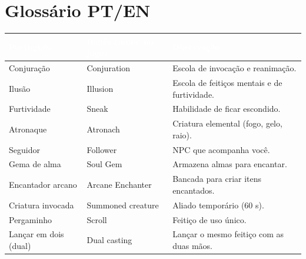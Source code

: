 \documentclass[11pt,a4paper,oneside,openany]{book}
\newcommand{\cabec}[1]{\textcolor{white}{\sffamily\bfseries\small #1}}
\newcommand{\tabhead}{\rowcolor{NecroEmerald}}
\begin{document}
\chapter{Glossário PT/EN}
\begin{center}
\small
{}
\begin{tabularx}{\linewidth}{@{}L{4cm}L{4cm}Y@{}}
\tabhead \cabec{Português} & \cabec{Inglês (nome no jogo)} & \cabec{Observação} \\
\toprule
Conjuração & Conjuration & Escola de invocação e reanimação. \\
Ilusão & Illusion & Escola de feitiços mentais e de furtividade. \\
Furtividade & Sneak & Habilidade de ficar escondido. \\
Atronaque & Atronach & Criatura elemental (fogo, gelo, raio). \\
Seguidor & Follower & NPC que acompanha você. \\
Gema de alma & Soul Gem & Armazena almas para encantar. \\
Encantador arcano & Arcane Enchanter & Bancada para criar itens encantados. \\
Criatura invocada & Summoned creature & Aliado temporário (60 s). \\
Pergaminho & Scroll & Feitiço de uso único. \\
Lançar em dois (dual) & Dual casting & Lançar o mesmo feitiço com as duas mãos. \\
\bottomrule
\end{tabularx}
\end{center}

\end{document}
